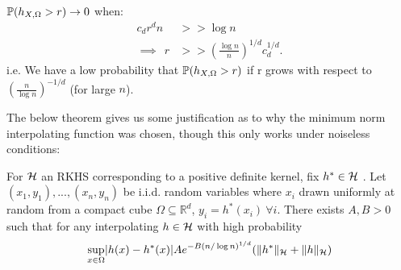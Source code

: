 \documentclass[twoside]{memoir}
\begin{document}
$\mathbb{P}(h_{X,\Omega} > r) \rightarrow 0$ when:
\begin{equation*}
\begin{split}
c_dr^dn &>> \log n\\
\implies ~~ r &>> (\frac{\log n}{n})^{1/d} c_d^{1/d}.
\end{split}
\end{equation*}
i.e. We have a low probability that $\mathbb{P}(h_{X,\Omega} > r)$ if r grows with respect to $(\frac{n}{\log n})^{-1/d}$ (for large $n$).  



The below theorem gives us some justification as to why the minimum norm interpolating function was chosen, though this only works under noiseless conditions:
\begin{thm} \label{thm:approx}
	For $\mathcal{H}$ an RKHS corresponding to a positive definite kernel, fix $h^* \in \mathcal{H}$  .
	Let $(x_1,y_1), ..., (x_n,y_n)$ be i.i.d. random variables where $x_i$ drawn uniformly at random from a compact cube $\Omega \subseteq \mathbb{R}^d $,
	$y_i = h^*(x_i) \: \forall i$. There exists $A, B > 0$ such that for any interpolating $h \in \mathcal{H} $ with high probability
	\begin{equation*}
	\sup_{x \in \Omega} \lvert h(x) - h^*(x)\rvert A e^{-B(n/ \log n)^{1/d}} (\lVert h^*\rVert_{\mathcal{H}} + \lVert h\rVert_{\mathcal{H}})
	\end{equation*}
\end{thm}
\end{document}
